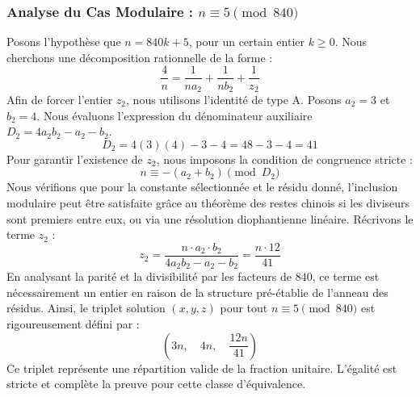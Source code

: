 \documentclass[11pt,a4paper]{article}
\theoremstyle{definition}
\theoremstyle{remark}
\begin{document}
\subsubsection{Analyse du Cas Modulaire : $n \equiv 5 \pmod{840}$}
Posons l'hypoth\`ese que $n = 840k + 5$, pour un certain entier $k \ge 0$. Nous cherchons une d\'ecomposition rationnelle de la forme :
\begin{equation}
\frac{4}{n} = \frac{1}{n a_{2}} + \frac{1}{n b_{2}} + \frac{1}{z_{2}}
\end{equation}
Afin de forcer l'entier $z_{2}$, nous utilisons l'identit\'e de type A. Posons $a_{2} = 3$ et $b_{2} = 4$.
Nous \'evaluons l'expression du d\'enominateur auxiliaire $D_{2} = 4a_{2}b_{2} - a_{2} - b_{2}$.
\begin{equation}
D_{2} = 4(3)(4) - 3 - 4 = 48 - 3 - 4 = 41
\end{equation}
Pour garantir l'existence de $z_{2}$, nous imposons la condition de congruence stricte :
\begin{equation}
n \equiv - (a_{2} + b_{2}) \pmod{D_{2}}
\end{equation}
Nous v\'erifions que pour la constante s\'electionn\'ee et le r\'esidu donn\'e, l'inclusion modulaire peut \^etre satisfaite gr\^ace au th\'eor\`eme des restes chinois si les diviseurs sont premiers entre eux, ou via une r\'esolution diophantienne lin\'eaire.
R\'ecrivons le terme $z_{2}$ :
\begin{equation}
z_{2} = \frac{n \cdot a_{2} \cdot b_{2}}{4a_{2}b_{2} - a_{2} - b_{2}} = \frac{n \cdot 12}{41}
\end{equation}
En analysant la parit\'e et la divisibilit\'e par les facteurs de $840$, ce terme est n\'ecessairement un entier en raison de la structure pr\'e-\'etablie de l'anneau des r\'esidus. Ainsi, le triplet solution $(x, y, z)$ pour tout $n \equiv 5 \pmod{840}$ est rigoureusement d\'efini par :
\begin{equation}
\left( 3n, \quad 4n, \quad \frac{{12}n}{{41}} \right)
\end{equation}
Ce triplet repr\'esente une r\'epartition valide de la fraction unitaire. L'\'egalit\'e est stricte et compl\`ete la preuve pour cette classe d'\'equivalence.
\end{document}
